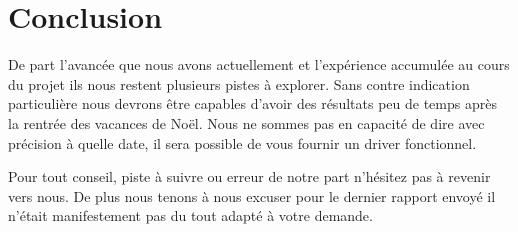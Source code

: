 
\chapter{Conclusion} %

\label{Chapter6} %


De part l’avancée que nous avons actuellement et l’expérience accumulée au cours du projet
ils nous restent plusieurs pistes à explorer. Sans contre indication particulière nous
devrons être capables d’avoir des résultats peu de temps après la rentrée des vacances de
Noël. Nous ne sommes pas en capacité de dire avec précision à quelle date, il sera
possible de vous fournir un driver fonctionnel.

Pour tout conseil, piste à suivre ou erreur de notre part n’hésitez pas à revenir vers nous.
De plus nous tenons à nous excuser pour le dernier rapport envoyé il n’était manifestement
pas du tout adapté à votre demande.

